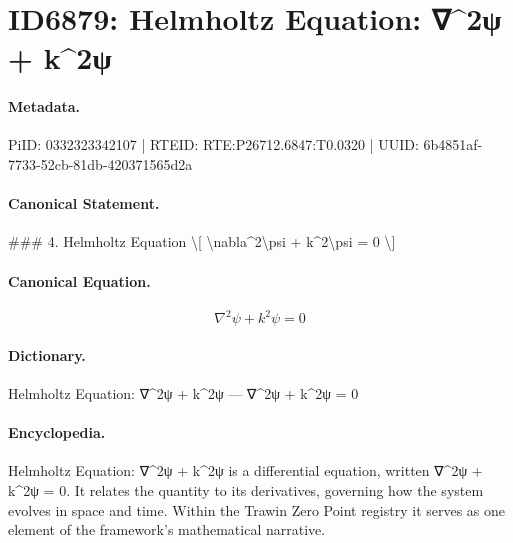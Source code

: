 \section*{ID6879: Helmholtz Equation: ∇\textasciicircum{}2ψ + k\textasciicircum{}2ψ}
\paragraph{Metadata.}
PiID: 0332323342107 | RTEID: RTE:P26712.6847:T0.0320 | UUID: 6b4851af-7733-52cb-81db-420371565d2a

\paragraph{Canonical Statement.}
\#\#\# 4. Helmholtz Equation \textbackslash{}[ \textbackslash{}nabla\textasciicircum{}2\textbackslash{}psi + k\textasciicircum{}2\textbackslash{}psi = 0 \textbackslash{}]

\paragraph{Canonical Equation.}
\[
\nabla^2\psi + k^2\psi = 0
\]

\paragraph{Dictionary.}
Helmholtz Equation: ∇\textasciicircum{}2ψ + k\textasciicircum{}2ψ — ∇\textasciicircum{}2ψ + k\textasciicircum{}2ψ = 0

\paragraph{Encyclopedia.}
Helmholtz Equation: ∇\textasciicircum{}2ψ + k\textasciicircum{}2ψ is a differential equation, written ∇\textasciicircum{}2ψ + k\textasciicircum{}2ψ = 0. It relates the quantity to its derivatives, governing how the system evolves in space and time. Within the Trawin Zero Point registry it serves as one element of the framework's mathematical narrative.
